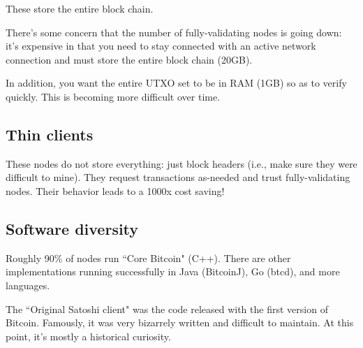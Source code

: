 \documentclass[12pt]{article}
\begin{document}
These store the entire block chain.

There's some concern that the number of fully-validating nodes is going down: it's expensive in that you need to stay connected with an active network connection and must store the entire block chain (20GB).

In addition, you want the entire UTXO set to be in RAM (1GB) so as to verify quickly. This is becoming more difficult over time.

\subsection*{Thin clients}

These nodes do not store everything: just block headers (i.e., make sure they were difficult to mine). They request transactions as-needed and trust fully-validating nodes. Their behavior leads to a 1000x cost saving!

\subsection*{Software diversity}

Roughly 90\% of nodes run ``Core Bitcoin" (C++). There are other implementations running successfully in Java (BitcoinJ), Go (btcd), and more languages.

The ``Original Satoshi client" was the code released with the first version of Bitcoin. Famously, it was very bizarrely written and difficult to maintain. At this point, it's mostly a historical curiosity.
\end{document}
